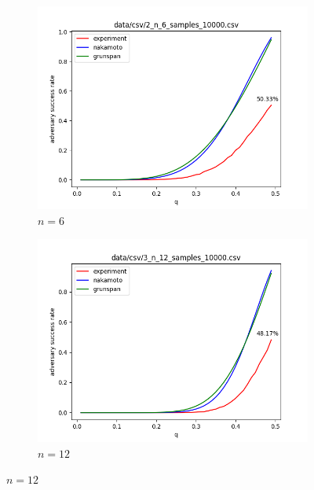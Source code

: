 \documentclass[a4paper,11pt]{article}
\theoremstyle{mytheor}
\begin{document}
\begin{figure}[H]
    \begin{subfigure}{0.5\textwidth}
        \includegraphics[width=1.0\linewidth]{2_n_6_samples_10000.png}
        \caption{$n = 6$}
        \label{fig:subim3}
    \end{subfigure}
    \begin{subfigure}{0.5\textwidth}
        \includegraphics[width=1.0\linewidth]{3_n_12_samples_10000.png}
        \caption{$n = 12$}
        \label{fig:subim4}
    \end{subfigure}


\end{figure}
\end{document}
